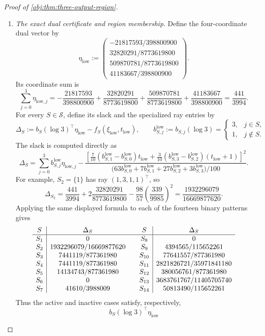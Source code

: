 \begin{proof}[Proof of \cref{obj:thm:three-output-region}]
\begin{enumerate}
\item \textit{The exact dual certificate and region membership.}
Define the four-coordinate dual vector by
\[
\eta_{\mathrm{low}}:=
\begin{pmatrix}
-21817593/398800900\\
32820291/8773619800\\
509870781/8773619800\\
41183667/398800900
\end{pmatrix}.
\]
Its coordinate sum is
\[
\sum_{j=0}^3\eta_{\mathrm{low},j}
=
-\frac{21817593}{398800900}
+\frac{32820291}{8773619800}
+\frac{509870781}{8773619800}
+\frac{41183667}{398800900}
=\frac{441}{3994}.
\]
For every \(S\in\mathcal S\), define its slack and the specialized ray entries by
\[
\Delta_S:=
b_S(\log3)^\top\eta_{\mathrm{low}}
-f_S(\xi_{\mathrm{low}},t_{\mathrm{low}}),
\qquad
b^{\mathrm{low}}_{S,j}:=b_{S,j}(\log3)
=
\begin{cases}
3,&j\in S,\\
1,&j\notin S.
\end{cases}
\]
The slack is computed directly as
\[
\Delta_S
=
\sum_{j=0}^3 b^{\mathrm{low}}_{S,j}\eta_{\mathrm{low},j}
-
\frac{
\left[
\frac7{10}(b^{\mathrm{low}}_{S,1}-b^{\mathrm{low}}_{S,0})t_{\mathrm{low}}
+
\frac3{10}(b^{\mathrm{low}}_{S,3}-b^{\mathrm{low}}_{S,2})(t_{\mathrm{low}}+1)
\right]^2}
{
\bigl(
63b^{\mathrm{low}}_{S,0}
+7b^{\mathrm{low}}_{S,1}
+27b^{\mathrm{low}}_{S,2}
+3b^{\mathrm{low}}_{S,3}
\bigr)/100
}.
\]
For example, \(S_2=\{1\}\) has ray \((1,3,1,1)^\top\), so
\[
\Delta_{S_2}
=
\frac{441}{3994}
+2\frac{32820291}{8773619800}
-\frac{98}{57}\left(\frac{339}{9985}\right)^2
=
\frac{1932296079}{16669877620}.
\]
Applying the same displayed formula to each of the fourteen binary patterns gives
\[
\begin{array}{c|c@{\qquad}c|c}
S&\Delta_S&S&\Delta_S\\ \hline
S_1&0&S_8&0\\
S_2&1932296079/16669877620&S_9&4394565/115652261\\
S_3&7441119/877361980&S_{10}&77641557/877361980\\
S_4&7441119/877361980&S_{11}&2821826721/35971841180\\
S_5&14134743/877361980&S_{12}&380056761/877361980\\
S_6&0&S_{13}&3683761767/11405705740\\
S_7&41610/3988009&S_{14}&50813490/115652261
\end{array}
\]
Thus the active and inactive cases satisfy, respectively,
\[
b_S(\log3)^\top\eta_{\mathrm{low}}
\]
\end{enumerate}
\end{proof}

